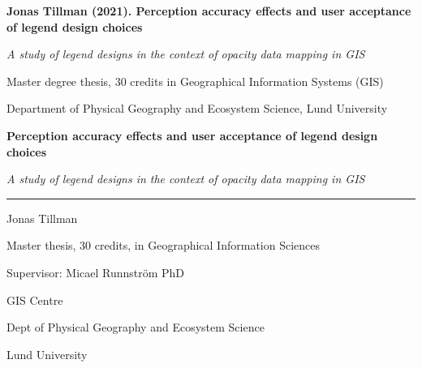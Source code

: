 
   
% 


\setcounter{page}{2}


\textbf{Jonas Tillman (2021). Perception accuracy effects and user acceptance of legend design choices}

\emph{A study of legend designs in the context of opacity data mapping in GIS}

Master degree thesis, 30 credits in Geographical Information Systems (GIS) 

Department of Physical Geography and Ecosystem Science, Lund University

\newpage



\begin{center}
    \vspace*{1cm}
        
    \Huge
    \textbf{Perception accuracy effects and user acceptance of legend design choices}
    
    \Large
    \emph{A study of legend designs in the context of opacity data mapping in GIS}
        
    \vspace{5cm}
        
    \rule{15cm}{1.0pt}

    \Large
    Jonas Tillman

    Master thesis, 30 credits, in Geographical Information Sciences
    
    \vspace{2cm}
    
    Supervisor: Micael Runnström PhD

    GIS Centre
    
    Dept of Physical Geography and Ecosystem Science
    
    Lund University
                    
\end{center}

\newpage

